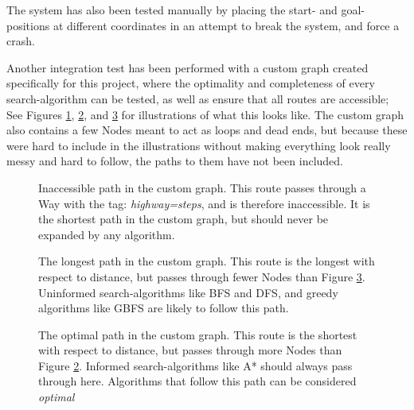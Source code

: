 The system has also been tested manually by placing the start- and goal-positions at different coordinates in an attempt to break the system, and force a crash.

Another integration test has been performed with a custom graph created specifically for this project, where the optimality and completeness of every search-algorithm can be tested, as well as ensure that all routes are accessible; See Figures \ref{fig:customInaccessible}, \ref{fig:customLongest}, and \ref{fig:customShortest} for illustrations of what this looks like. The custom graph also contains a few Nodes meant to act as loops and dead ends, but because these were hard to include in the illustrations without making everything look really messy and hard to follow, the paths to them have not been included.

\begin{figure}
	\centering
	\caption[Inaccessible path in the custom graph]{Inaccessible path in the custom graph. This route passes through a Way with the tag: \textit{highway=steps}, and is therefore inaccessible. It is the shortest path in the custom graph, but should never be expanded by any algorithm.}
	\label{fig:customInaccessible}
\end{figure}

\begin{figure}
	\centering
	\caption[Longest path in the custom graph]{The longest path in the custom graph. This route is the longest with respect to distance, but passes through fewer Nodes than Figure \ref{fig:customShortest}. Uninformed search-algorithms like BFS and DFS, and greedy algorithms like GBFS are likely to follow this path.}
	\label{fig:customLongest}
\end{figure}

\begin{figure}
	\centering
	\caption[Optimal path in the custom graph]{The optimal path in the custom graph. This route is the shortest with respect to distance, but passes through more Nodes than Figure \ref{fig:customLongest}. Informed search-algorithms like A* should always pass through here. Algorithms that follow this path can be considered \textit{optimal}}
	\label{fig:customShortest}
\end{figure}


